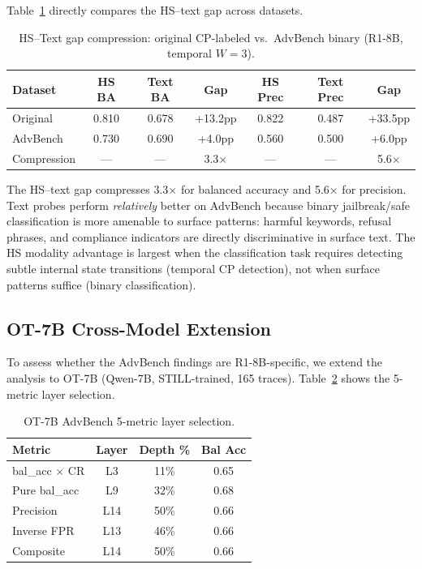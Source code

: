 \documentclass[11pt]{article}
\begin{document}
Table~\ref{tab:gap-compression} directly compares the HS--text gap across datasets.

\begin{table}[t]
\centering
\small
\caption{HS--Text gap compression: original CP-labeled vs.\ AdvBench binary (R1-8B, temporal $W{=}3$).}
\label{tab:gap-compression}
\begin{tabular}{lcccccc}
\toprule
Dataset & HS BA & Text BA & Gap & HS Prec & Text Prec & Gap \\
\midrule
Original & 0.810 & 0.678 & +13.2pp & 0.822 & 0.487 & +33.5pp \\
AdvBench & 0.730 & 0.690 & +4.0pp & 0.560 & 0.500 & +6.0pp \\
\midrule
Compression & --- & --- & 3.3$\times$ & --- & --- & 5.6$\times$ \\
\bottomrule
\end{tabular}
\end{table}

The HS--text gap compresses 3.3$\times$ for balanced accuracy and 5.6$\times$ for precision. Text probes perform \emph{relatively} better on AdvBench because binary jailbreak/safe classification is more amenable to surface patterns: harmful keywords, refusal phrases, and compliance indicators are directly discriminative in surface text. The HS modality advantage is largest when the classification task requires detecting subtle internal state transitions (temporal CP detection), not when surface patterns suffice (binary classification).

\subsection{OT-7B Cross-Model Extension}

To assess whether the AdvBench findings are R1-8B-specific, we extend the analysis to OT-7B (Qwen-7B, STILL-trained, 165 traces). Table~\ref{tab:ot7b-metrics} shows the 5-metric layer selection.

\begin{table}[t]
\centering
\small
\caption{OT-7B AdvBench 5-metric layer selection.}
\label{tab:ot7b-metrics}
\begin{tabular}{lccc}
\toprule
Metric & Layer & Depth \% & Bal Acc \\
\midrule
bal\_acc $\times$ CR & L3 & 11\% & 0.65 \\
Pure bal\_acc & L9 & 32\% & 0.68 \\
Precision & L14 & 50\% & 0.66 \\
Inverse FPR & L13 & 46\% & 0.66 \\
Composite & L14 & 50\% & 0.66 \\
\bottomrule
\end{tabular}
\end{table}
\end{document}
